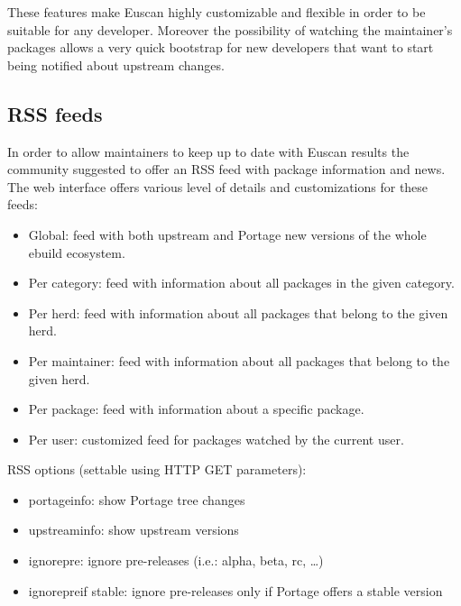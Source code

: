These features make Euscan highly customizable and flexible in order to be suitable for any developer. Moreover the possibility of watching the maintainer's packages allows a very quick bootstrap for new developers that want to start being notified about upstream changes.


\subsection{RSS feeds}
\label{subsec:rss}

In order to allow maintainers to keep up to date with Euscan results the community suggested to offer an RSS feed with package information and news. The web interface offers various level of details and customizations for these feeds:
\begin{itemize}
\item Global: feed with both upstream and Portage new versions of the whole ebuild ecosystem.

\item Per category: feed with information about all packages in the given category.

\item Per herd: feed with information about all packages that belong to the given herd.

\item Per maintainer: feed with information about all packages that belong to the given herd.

\item Per package: feed with information about a specific package.

\item Per user: customized feed for packages watched by the current user.
\end{itemize}

\vspace{0.5cm}

RSS options (settable using HTTP GET parameters):
\begin{itemize}
\item portage\textunderscore info: show Portage tree changes
\item upstream\textunderscore info: show upstream versions
\item ignore\textunderscore pre: ignore pre-releases (i.e.: alpha, beta, rc, \ldots)
\item ignore\textunderscore pre\textunderscore if \textunderscore stable: ignore pre-releases only if Portage offers a stable version
\end{itemize}


